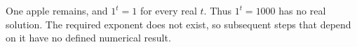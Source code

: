 One apple remains, and $1^t=1$ for every real $t$. Thus $1^t=1000$ has no real solution. The required exponent does not exist, so subsequent steps that depend on it have no defined numerical result.
